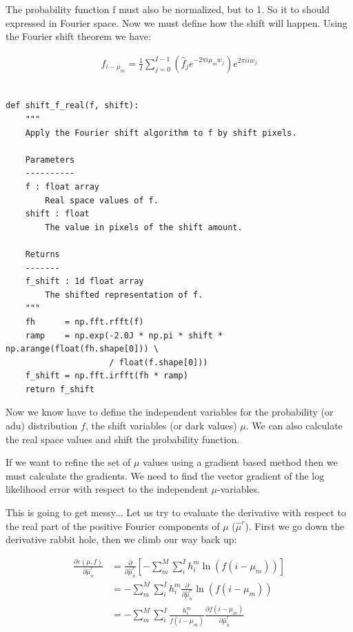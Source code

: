 \documentclass[11pt]{article}
\begin{document}
The probability function f must also be normalized, but to 1. So it to should expressed in Fourier space. Now we must define how the shift will happen. Using the Fourier shift theorem we have:

\begin{align}
f_{i - \mu_m} = \frac{1}{I} \sum_{j=0}^{I-1} (\hat{f}_j e^{-2\pi i \mu_m w_j}) e^{2\pi i i w_j}
\end{align}

\begin{verbatim}

def shift_f_real(f, shift):
    """
    Apply the Fourier shift algorithm to f by shift pixels.
    
    Parameters
    ----------
    f : float array
        Real space values of f.
    shift : float
        The value in pixels of the shift amount.
            
    Returns
    -------
    f_shift : 1d float array
        The shifted representation of f.
    """
    fh      = np.fft.rfft(f)
    ramp    = np.exp(-2.0J * np.pi * shift * np.arange(float(fh.shape[0])) \
                     / float(f.shape[0]))
    f_shift = np.fft.irfft(fh * ramp)
    return f_shift

\end{verbatim}

Now we know have to define the independent variables for the probability (or adu) distribution $f$, the shift variables (or dark values) $\mu$. We can also calculate the real space values and shift the probability function. 

If we want to refine the set of $\mu$ values using a gradient based method then we must calculate the gradients. We need to find the vector gradient of the log likelihood error with respect to the independent $\mu$-variables. 

This is going to get messy... Let us try to evaluate the derivative with respect to the real part of the positive Fourier components of $\mu$ ($\hat{\mu}^r$). First we go down the derivative rabbit hole, then we climb our way back up: 

\begin{align}
   \frac{\partial \varepsilon(\mu, f)}{\partial \hat{\mu}^r_n} &= \frac{\partial}{\partial \hat{\mu}^r_n}\left[-\sum_m^M \sum_i^I h^m_i \ln(f(i - \mu_m))\right] \\
   &=  -\sum_m^M \sum_i^I h^m_i \frac{\partial}{\partial \hat{\mu}^r_n} \ln(f(i - \mu_m)) \\
   &=  -\sum_m^M \sum_i^I \frac{h^m_i}{f(i - \mu_m)} \frac{\partial f(i - \mu_m)}{\partial \hat{\mu}^r_n}
\end{align}
\end{document}

